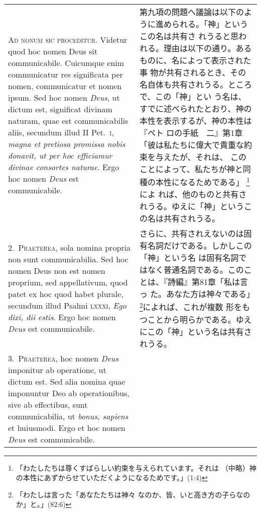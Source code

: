 \documentclass[paper=a4paper,fontsize=10pt,jafontsize=9pt,titlepage]{jlreq}
\begin{document}
\begin{longtable}{p{21em}p{21em}}

{\huge A}{\scshape d nonum sic proceditur}. Videtur quod hoc nomen
Deus sit communicabile. Cuicumque enim communicatur res significata
per nomen, communicatur et nomen ipsum. Sed hoc nomen {\itshape Deus},
ut dictum est, significat divinam naturam, quae est communicabilis
aliis, secundum illud II Pet.~{\scshape i}, {\itshape magna et
pretiosa promissa nobis donavit, ut per hoc efficiamur divinae
consortes naturae}. Ergo hoc nomen {\itshape Deus} est communicabile.

&

第九項の問題へ議論は以下のように進められる。「神」というこの名は共有さ
れうると思われる。理由は以下の通り。あるものに、名によって表示された事
物が共有されるとき、その名自体も共有されうる。ところで、この「神」とい
う名は、すでに述べられたとおり、神の本性を表示するが、神の本性は『ペト
ロの手紙　二』第1章「彼は私たちに偉大で貴重な約束を与えたが、それは、
このことによって、私たちが神と同種の本性になるためである」
\footnote{「わたしたちは尊くすばらしい約束を与えられています。それは
（中略）神の本性にあずからせていただくようになるためです。」(1:4)}によ
れば、他のものと共有されうる。ゆえに「神」というこの名は共有されうる。

\\

2.~{\scshape Praeterea}, sola nomina propria non sunt
communicabilia. Sed hoc nomen Deus non est nomen proprium, sed
appellativum, quod patet ex hoc quod habet plurale, secundum illud
Psalmi {\scshape lxxxi}, {\itshape Ego dixi, dii estis}. Ergo hoc
nomen {\itshape Deus} est communicabile.

&

さらに、共有されえないのは固有名詞だけである。しかしこの「神」という名
は固有名詞ではなく普通名詞である。このことは、『詩編』第81章「私は言っ
た。あなた方は神々である」\footnote{「わたしは言った「あなたたちは神々
なのか、皆、いと高き方の子らなのか」と。」(82:6)}によれば、これが複数
形をもつことから明らかである。ゆえにこの「神」という名は共有されうる。

\\

3.~{\scshape Praeterea}, hoc nomen {\itshape Deus} imponitur ab
operatione, ut dictum est. Sed alia nomina quae imponuntur Deo ab
operationibus, sive ab effectibus, sunt communicabilia, ut {\itshape
bonus, sapiens} et huiusmodi. Ergo et hoc nomen {\itshape Deus} est
communicabile.

&


\end{longtable}
\end{document}
